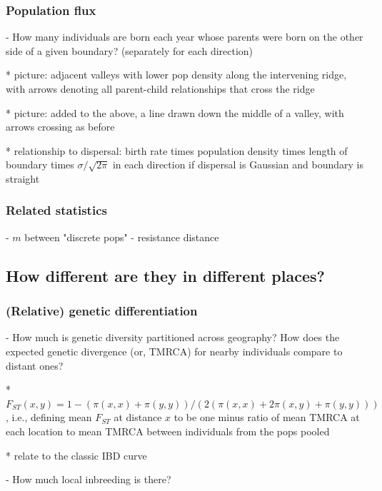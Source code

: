 \documentclass{ar-1col}
\begin{document}
\subsubsection{Population flux}

        - How many individuals are born each year whose parents were born on the other side of a given boundary?
            (separately for each direction)

            * picture: adjacent valleys with lower pop density along the intervening ridge,
                with arrows denoting all parent-child relationships that cross the ridge 

            * picture: added to the above, a line drawn down the middle of a valley, with arrows crossing as before

            * relationship to dispersal: birth rate times population density times length of boundary times $\sigma/\sqrt{2\pi}$ in each direction 
                if dispersal is Gaussian and boundary is straight

\subsubsection{Related statistics}

        - $m$ between "discrete pops"
        - resistance distance


\subsection{How different are they in different places?}

\subsubsection{(Relative) genetic differentiation}

        - How much is genetic diversity partitioned across geography?
            How does the expected genetic divergence (or, TMRCA) for nearby individuals compare to distant ones?
            
            * $F_{ST}(x,y) = 1 - (\pi(x,x) + \pi(y,y))/(2 (\pi(x,x) + 2 \pi(x,y) + \pi(y,y)))$, 
                i.e., defining mean $F_{ST}$ at distance $x$ to be one minus ratio of mean TMRCA at each location
                to mean TMRCA between individuals from the pops pooled

            * relate to the classic IBD curve

        - How much local inbreeding is there?
\end{document}
